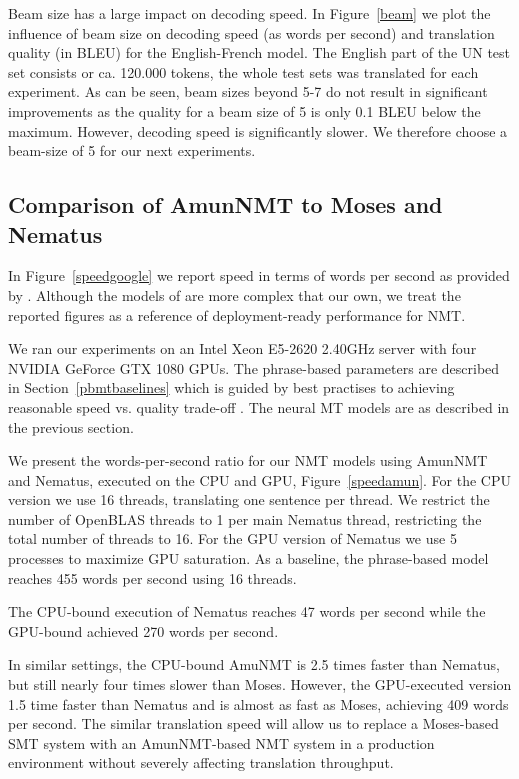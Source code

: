 \documentclass[11pt]{article}
\begin{document}
Beam size has a large impact on decoding speed. In Figure~\ref{beam} we plot the influence of beam size on decoding speed (as words per second) and translation quality (in BLEU) for the English-French model. The English part of the UN test set consists or ca. 120.000 tokens, the whole test sets was translated for each experiment. As can be seen, beam sizes beyond 5-7 do not result in significant improvements as the quality for a beam size of 5 is only 0.1 BLEU below the maximum. However, decoding speed is significantly slower. We therefore choose a beam-size of 5 for our next experiments.  

\subsection{Comparison of AmunNMT to Moses and Nematus}

In Figure~\ref{speedgoogle} we report speed in terms of words per second as provided by . Although the models of  are more complex that our own, we treat the reported figures as a reference of deployment-ready performance for NMT. 

We ran our experiments on an Intel Xeon E5-2620 2.40GHz server with four NVIDIA GeForce GTX 1080 GPUs. The phrase-based parameters are described in Section~\ref{pbmtbaselines} which is guided by best practises to achieving reasonable speed vs. quality trade-off \cite{junczys_mtsummit_2013}. The neural MT models are as described in the previous section.

We present the words-per-second ratio for our NMT models using AmunNMT and Nematus, executed on the CPU and GPU, Figure~\ref{speedamun}. For the CPU version we use 16 threads, translating one sentence per thread. We restrict the number of OpenBLAS threads to 1 per main Nematus thread, restricting the total number of threads to 16. For the GPU version of Nematus we use 5 processes to maximize GPU saturation. As a baseline, the phrase-based model reaches 455 words per second using 16 threads.

The CPU-bound execution of Nematus reaches 47 words per second while the GPU-bound achieved 270 words per second. 

In similar settings, the CPU-bound AmuNMT is 2.5 times faster than Nematus, but still nearly four times slower than Moses. However, the GPU-executed version 1.5 time faster than Nematus and is almost as fast as Moses, achieving 409 words per second. The similar translation speed will allow us to replace a Moses-based SMT system with an AmunNMT-based NMT system in a production environment without severely affecting translation throughput. 
\end{document}
